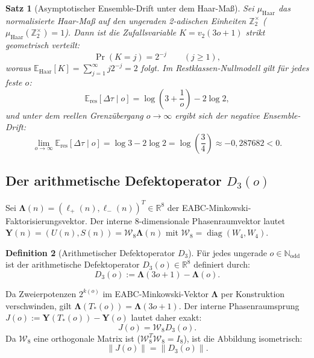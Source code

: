 \documentclass[11pt,a4paper]{article}
\theoremstyle{plain}
\newtheorem{theorem}{Satz}[section]
\theoremstyle{definition}
\newtheorem{definition}[theorem]{Definition}
\newcommand{\N}{\mathbb{N}}
\newcommand{\Z}{\mathbb{Z}}
\newcommand{\R}{\mathbb{R}}
\newcommand{\E}{\mathbb{E}}
\DeclareMathOperator{\diag}{diag}
\begin{document}
\begin{theorem}[Asymptotischer Ensemble-Drift unter dem Haar-Maß]
Sei $\mu_{\mathrm{Haar}}$ das normalisierte Haar-Maß auf den ungeraden 2-adischen Einheiten $\Z_2^\times$ ($\mu_{\mathrm{Haar}}(\Z_2^\times) = 1$). Dann ist die Zufallsvariable $K = v_2(3o+1)$ strikt geometrisch verteilt:
\begin{equation}
    \Pr(K = j) = 2^{-j} \qquad (j \ge 1),
\end{equation}
woraus $\E_{\mathrm{Haar}}[K] = \sum_{j=1}^\infty j 2^{-j} = 2$ folgt. Im Restklassen-Nullmodell gilt für jedes feste $o$:
\begin{equation}
    \E_{\mathrm{res}}[\Delta\tau \mid o] = \log\left(3 + \frac{1}{o}\right) - 2\log 2,
\end{equation}
und unter dem reellen Grenzübergang $o \to \infty$ ergibt sich der negative Ensemble-Drift:
\begin{equation}
    \lim_{o \to \infty} \E_{\mathrm{res}}[\Delta\tau \mid o] = \log 3 - 2\log 2 = \log\left(\frac{3}{4}\right) \approx -0{,}287682 < 0.
\end{equation}
\end{theorem}

\subsection{Der arithmetische Defektoperator \texorpdfstring{$D_3(o)$}{D3(o)}}

Sei $\boldsymbol{\Lambda}(n) = (\boldsymbol{\ell}_+(n), \boldsymbol{\ell}_-(n))^T \in \R^8$ der EABC-Minkowski-Faktorisierungsvektor. Der interne 8-dimensionale Phasenraumvektor lautet $\mathbf{Y}(n) = (U(n), S(n)) = \mathcal{W}_8 \boldsymbol{\Lambda}(n)$ mit $\mathcal{W}_8 = \diag(W_4, W_4)$.

\begin{definition}[Arithmetischer Defektoperator $D_3$]
Für jedes ungerade $o \in \N_{\mathrm{odd}}$ ist der arithmetische Defektoperator $D_3(o) \in \R^8$ definiert durch:
\begin{equation}
    D_3(o) := \boldsymbol{\Lambda}(3o+1) - \boldsymbol{\Lambda}(o).
\end{equation}
\end{definition}

Da Zweierpotenzen $2^{k(o)}$ im EABC-Minkowski-Vektor $\boldsymbol{\Lambda}$ per Konstruktion verschwinden, gilt $\boldsymbol{\Lambda}(T_*(o)) = \boldsymbol{\Lambda}(3o+1)$. Der interne Phasenraumsprung $J(o) := \mathbf{Y}(T_*(o)) - \mathbf{Y}(o)$ lautet daher exakt:
\begin{equation}
    J(o) = \mathcal{W}_8 D_3(o).
\end{equation}
Da $\mathcal{W}_8$ eine orthogonale Matrix ist ($\mathcal{W}_8^T \mathcal{W}_8 = I_8$), ist die Abbildung isometrisch:
\begin{equation}
    \|J(o)\| = \|D_3(o)\|.
\end{equation}
\end{document}
